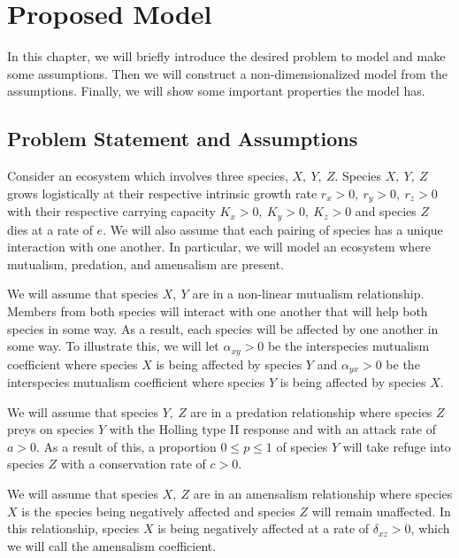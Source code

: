 
\chapter{Proposed Model}\label{ch:proposed-model}
In this chapter, we will briefly introduce the desired problem to model and make some assumptions. Then we will construct a non-dimensionalized model from the assumptions. Finally, we will show some important properties the model has.

\section{Problem Statement and Assumptions}\label{sec:problem-statement-and-assumptions}
Consider an ecosystem which involves three species, $X,\ Y,\ Z$. Species $X,\ Y,\ Z$ grows logistically at their respective intrinsic growth rate $r_x>0,\ r_y>0,\ r_z>0$ with their respective carrying capacity $K_x>0,\ K_y>0,\ K_z>0$ and species $Z$ dies at a rate of $e$. We will also assume that each pairing of species has a unique interaction with one another. In particular, we will model an ecosystem where mutualism, predation, and amensalism are present. %

We will assume that species $X,\ Y$ are in a non-linear mutualism relationship. Members from both species will interact with one another that will help both species in some way. As a result, each species will be affected by one another in some way. To illustrate this, we will let $\alpha_{xy} > 0$ be the interspecies mutualism coefficient where species $X$ is being affected by species $Y$ and $\alpha_{yx} > 0$ be the interspecies mutualism coefficient where species $Y$ is being affected by species $X$.

We will assume that species $Y,\ Z$ are in a predation relationship where species $Z$ preys on species $Y$ with the Holling type II response and with an attack rate of $a > 0$. As a result of this, a proportion $0 \leq p \leq 1$ of species $Y$ will take refuge into species $Z$ with a conservation rate of $c > 0$. 

We will assume that species $X,\ Z$ are in an amensalism relationship where species $X$ is the species being negatively affected and species $Z$ will remain unaffected. In this relationship, species $X$ is being negatively affected at a rate of $\delta_{xz} > 0$, which we will call the amensalism coefficient.

